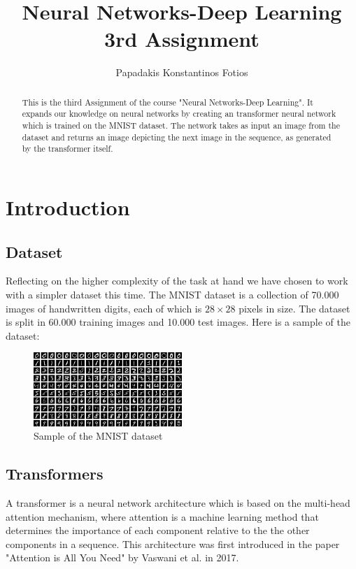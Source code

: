 \documentclass[lettersize,journal]{IEEEtran}
\begin{document}
\title{Neural Networks-Deep Learning \\ 3rd Assignment}
\author{Papadakis Konstantinos Fotios}
\maketitle

\begin{abstract}
This is the third Assignment of the course "Neural Networks-Deep Learning". It expands our 
knowledge on neural networks by creating an transformer neural network which is trained on 
the MNIST dataset. The network takes as input an image from the dataset and returns an image
depicting the next image in the sequence, as generated by the transformer itself.  
\end{abstract}

\section{Introduction}
\subsection{Dataset}
Reflecting on the higher complexity of the task at hand we have chosen to work with a simpler
dataset this time. The MNIST dataset is a collection of 70.000 images of handwritten digits,
each of which is $28 \times 28$ pixels in size. The dataset is split in 60.000 training images and
10.000 test images. Here is a sample of the dataset:
\begin{figure}[H]   
    \centering
    \includegraphics[width=0.5\textwidth]{media/MNIST_dataset_example.png}
    \caption{Sample of the MNIST dataset}
\end{figure}

\subsection{Transformers}
A transformer is a neural network architecture which is based on the multi-head attention
mechanism, where attention is a machine learning method that determines the importance of
each component relative to the the other components in a sequence. This architecture was 
first introduced in the paper "Attention is All You Need" by Vaswani et al. in 2017.
\end{document}
